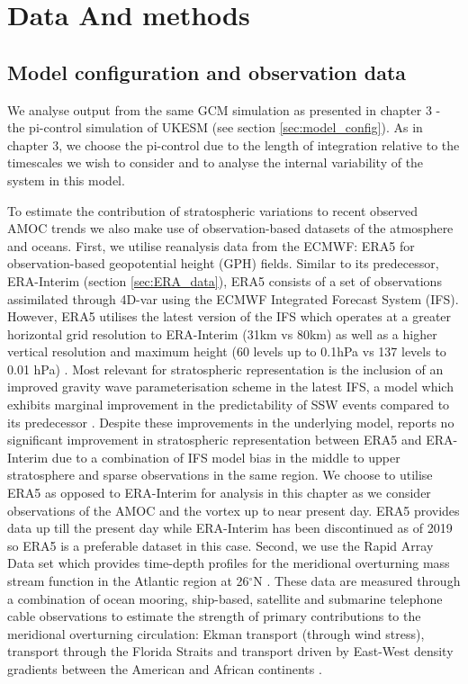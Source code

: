 \section{Data And methods}
\subsection{Model configuration and observation data}

We analyse output from the same GCM simulation as presented in chapter 3 - the pi-control simulation of UKESM (see section \ref{sec:model_config}). As in chapter 3, we choose the pi-control due to the length of integration relative to the timescales we wish to consider and to analyse the internal variability of the system in this model. 

To estimate the contribution of stratospheric variations to recent observed AMOC trends we also make use of observation-based datasets of the atmosphere and oceans. First, we utilise reanalysis data from the ECMWF: ERA5 \citep{hersbachERA52020c} for observation-based geopotential height (GPH) fields. Similar to its predecessor, ERA-Interim (section \ref{sec:ERA_data}), ERA5 consists of a set of observations assimilated through 4D-var using the ECMWF Integrated Forecast System (IFS). However, ERA5 utilises the latest version of the IFS which operates at a greater horizontal grid resolution to ERA-Interim (31km vs 80km) as well as a higher vertical resolution and maximum height (60 levels up to 0.1hPa vs 137 levels to 0.01 hPa) \citep{hersbachERA52020c}. Most relevant for stratospheric representation is the inclusion of an improved gravity wave parameterisation scheme in the latest IFS, a model which exhibits marginal improvement in the predictability of SSW events compared to its predecessor \citep{orrImproved2010a}. Despite these improvements in the underlying model, \cite{hersbachERA52020c} reports no significant improvement in stratospheric representation between ERA5 and ERA-Interim due to a combination of IFS model bias in the middle to upper stratosphere and sparse observations in the same region. We choose to utilise ERA5 as opposed to ERA-Interim for analysis in this chapter as we consider observations of the AMOC and the vortex up to near present day. ERA5 provides data up till the present day while ERA-Interim has been discontinued as of 2019 so ERA5 is a preferable dataset in this case. 
Second, we use the Rapid Array Data set which provides time-depth profiles for the meridional overturning mass stream function in the Atlantic region at 26$^{\circ}$N \citep{moatAtlantic2020c}. These data are measured through a combination of ocean mooring, ship-based, satellite and submarine telephone cable observations to estimate the strength of primary contributions to the meridional overturning circulation: Ekman transport (through wind stress), transport through the Florida Straits and transport driven by East-West density gradients between the American and African continents \citep{mccarthyMeasuring2015b}.

